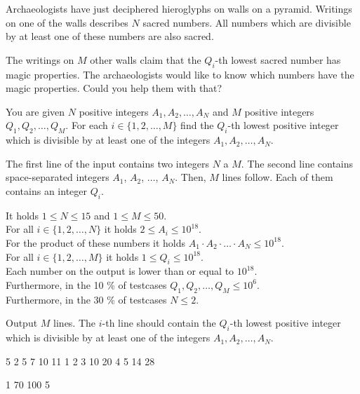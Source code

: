 





Archaeologists have just deciphered hieroglyphs on walls on a pyramid. Writings
on one of the walls describes $N$ sacred numbers. All numbers which are
divisible by at least one of these numbers are also sacred.

The writings on $M$ other walls claim that the $Q_i$-th lowest sacred number has
magic properties. The archaeologists would like to know which numbers have the
magic properties. Could you help them with that?


You are given $N$ positive integers $A_1, A_2, \ldots, A_N$ and $M$ positive
integers $Q_1, Q_2, \ldots, Q_M$. For each $i \in \{ 1, 2, \ldots, M \}$ find the
$Q_i$-th lowest positive integer which is divisible by at least one of the
integers $A_1, A_2, \ldots, A_N$.


The first line of the input contains two integers $N$ a $M$. The second line
contains space-separated integers $A_1$, $A_2$, $\ldots$, $A_N$. Then, $M$ lines
follow. Each of them contains an integer $Q_i$.

\bigskip
\noindent
It holds $1 \leq N \leq 15$ and $1 \leq M \leq 50$.\\
For all $i \in \{ 1, 2, \ldots, N \}$ it holds $2 \leq A_i \leq 10^{18}$.\\
For the product of these numbers it holds $A_1 \cdot A_2 \cdot \ldots \cdot A_N \leq 10^{18}$.\\
For all $i \in \{ 1, 2, \ldots, M \}$ it holds $1 \leq Q_i \leq 10^{18}$.\\
Each number on the output is lower than or equal to $10^{18}$.\\
Furthermore, in the 10 \% of testcases $Q_1, Q_2, \ldots, Q_M \leq 10^6$.\\
Furthermore, in the 30 \% of testcases $N \leq 2$.


Output $M$ lines. The $i$-th line should contain the $Q_i$-th lowest positive
integer which is divisible by at least one of the integers
$A_1, A_2, \ldots, A_N$.


 5
2 5 7 10 11
1
2
3
10
20
4
5
14
28
\sampleEND

 1
70 100
5
\sampleEND


